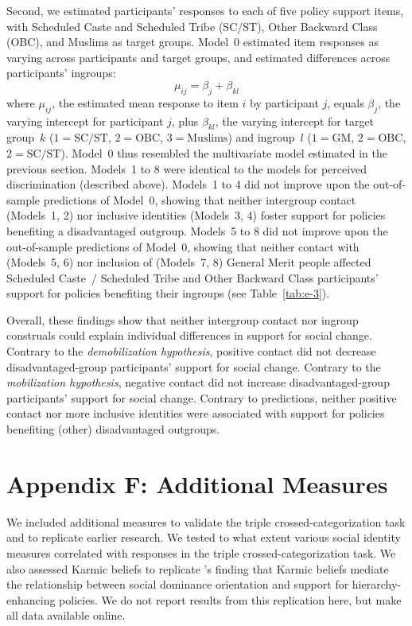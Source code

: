 \documentclass[12pt, a4paper]{article}
\begin{document}
Second, we estimated participants' responses to each of five policy support items, with Scheduled Caste and Scheduled Tribe (SC/ST), Other Backward Class (OBC), and Muslims as target groups. Model~0 estimated item responses as varying across participants and target groups, and estimated differences across participants' ingroups: $$ \mu_{ij} = \beta_{j} + \beta_{kl} $$ where $\mu_{ij}$, the estimated mean response to item $i$ by participant $j$, equals $\beta_j$, the varying intercept for participant $j$, plus $\beta_{kl}$, the varying intercept for target group~$k$ ($1 = \text{SC/ST}$, $2 = \text{OBC}$, $3 = \text{Muslims}$) and ingroup~$l$ ($1 = \text{GM}$, $2 = \text{OBC}$, $2 = \text{SC/ST}$). Model~0 thus resembled the multivariate model estimated in the previous section. Models~1 to 8 were identical to the models for perceived discrimination (described above). Models~1 to 4 did not improve upon the out-of-sample predictions of Model~0, showing that neither intergroup contact (Models~1, 2) nor inclusive identities (Models~3, 4) foster support for policies benefiting a disadvantaged outgroup.  Models~5 to 8 did not improve upon the out-of-sample predictions of Model~0, showing that neither contact with (Models~5, 6) nor inclusion of (Models~7, 8) General Merit people affected Scheduled Caste~/ Scheduled Tribe and Other Backward Class participants' support for policies benefiting their ingroups (see Table~\ref{tab:e-3}).

Overall, these findings show that neither intergroup contact nor ingroup construals could explain individual differences in support for social change. Contrary to the \emph{demobilization hypothesis}, positive contact did not decrease disadvantaged-group participants' support for social change. Contrary to the \emph{mobilization hypothesis}, negative contact did not increase disadvantaged-group participants' support for social change. Contrary to predictions, neither positive contact nor more inclusive identities were associated with support for policies benefiting (other) disadvantaged outgroups.

\section{Appendix F: Additional Measures}

We included additional measures to validate the triple crossed-categorization task and to replicate earlier research. We tested to what extent various social identity measures correlated with responses in the triple crossed-categorization task. We also assessed Karmic beliefs to replicate \citeauthor{cotterill_ideological_2014}'s \citeyear{cotterill_ideological_2014} finding that Karmic beliefs mediate the relationship between social dominance orientation and support for hierarchy-enhancing policies. We do not report results from this replication here, but make all data available online.
\end{document}
